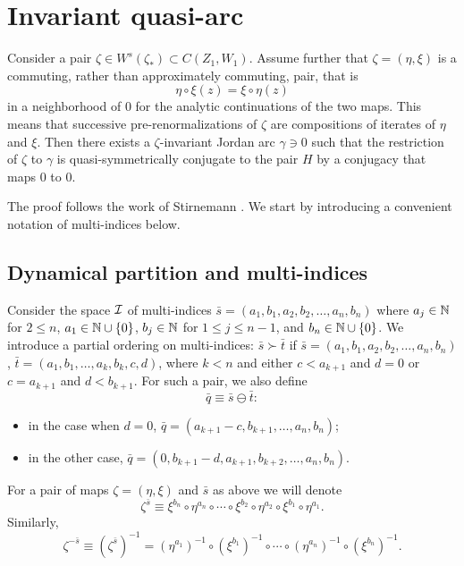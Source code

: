 \section{Invariant quasi-arc}
\label{sec:quasiarc}


\begin{thm}
\label{mainthm4}
Consider a pair $\zeta\in W^s(\zeta_*) \subset C(Z_1,W_1)$. Assume further that $\zeta=(\eta,\xi)$ is a commuting, rather than approximately commuting, pair, that is
$$\eta\circ\xi(z)=\xi\circ\eta(z)$$
in a neighborhood of $0$ for the analytic continuations of the two maps. This means that successive pre-renormalizations of $\zeta$
are compositions of iterates of $\eta$ and $\xi$.
Then there exists a $\zeta$-invariant Jordan arc $\gamma\ni 0$ such that
the restriction of $\zeta$ to $\gamma$ is quasi-symmetrically conjugate to the pair $H$ by a conjugacy that maps $0$ to $0$.
\end{thm}
The proof follows the work of Stirnemann \cite{Stir}. We start by introducing a convenient notation of multi-indices below.

\subsection{Dynamical partition and multi-indices}
Consider the space $\mathcal{I}$ of multi-indices $\bar s=(a_1,b_1,a_2,b_2,\ldots,a_n,b_n)$ where $a_j\in {\Bbb N}$ for $2\leq n$, $a_1\in{\Bbb N}\cup\{0\}$,
$b_j\in{\Bbb N}$ for $1\leq j\leq n-1$, and $b_n\in{\Bbb N}\cup\{0\}$. 
We introduce a partial ordering on multi-indices:
$\bar s\succ \bar t$ if $\bar s=(a_1,b_1,a_2,b_2,\ldots,a_n,b_n)$, $\bar t=(a_1,b_1,\ldots,a_k,b_k,c,d)$, where $k<n$ and 
either $c< a_{k+1}$ and $ d=0$ or $c=a_{k+1}$ and $d< b_{k+1}$. For such a pair, we also define
$$\bar q\equiv \bar s\ominus \bar t:$$
\begin{itemize}
\item in the case when $d=0$, $\bar q=(a_{k+1}-c,b_{k+1},\ldots, a_n,b_n)$;
\item in the other case, $\bar q=(0,b_{k+1}-d,a_{k+1},b_{k+2},\ldots, a_n,b_n).$
\end{itemize}

For a pair of maps $\zeta=(\eta,\xi)$ and $\bar s $ as above we will denote 
$$\zeta^{\bar s}\equiv\xi^{b_n}\circ\eta^{a_n}\circ\cdots\circ\xi^{b_2}\circ\eta^{a_2}\circ\xi^{b_1}\circ \eta^{a_1}.$$
Similarly, 
$$\zeta^{-\bar s}\equiv (\zeta^{\bar s})^{-1}=(\eta^{a_1})^{-1}\circ(\xi^{b_1})^{-1}\circ\cdots\circ(\eta^{a_n})^{-1}\circ (\xi^{b_n})^{-1}.$$

